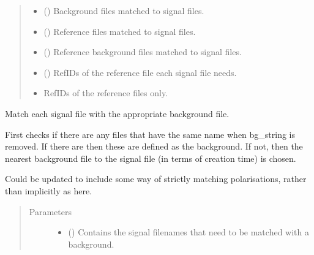 \documentclass[a4paper,10pt,english]{sphinxmanual}
\begin{document}
\begin{fulllineitems}
\begin{fulllineitems}
\begin{quote}
\begin{description}
\begin{itemize}
\item {} 
\sphinxAtStartPar
{} () \textendash{} Background files matched to signal files.

\item {} 
\sphinxAtStartPar
{} () \textendash{} Reference files matched to signal files.

\item {} 
\sphinxAtStartPar
{} () \textendash{} Reference background files matched to signal files.

\item {} 
\sphinxAtStartPar
{} () \textendash{} RefIDs of the reference file each signal file needs.

\item {} 
\sphinxAtStartPar
{} \textendash{} RefIDs of the reference files only.

\end{itemize}


\end{description}\end{quote}

\end{fulllineitems}


\begin{fulllineitems}
\label{\detokenize{sfgtools:sfgtools.SFGProcessTools.match_files_with_background}}
\sphinxAtStartPar
Match each signal file with the appropriate background file.

\sphinxAtStartPar
First checks if there are any files that have the same name when bg\_string is removed. If there are
then these are defined as the background. If not, then the nearest background file to the signal
file (in terms of creation time) is chosen.

\sphinxAtStartPar
Could be updated to include some way of strictly matching polarisations, rather than implicitly as
here.
\begin{quote}\begin{description}
\item[{Parameters}] \leavevmode\begin{itemize}
\item {} 
\sphinxAtStartPar
{} () \textendash{} Contains the signal filenames that need to be matched with a background.


\end{itemize}
\end{description}
\end{quote}
\end{fulllineitems}
\end{fulllineitems}
\end{document}
